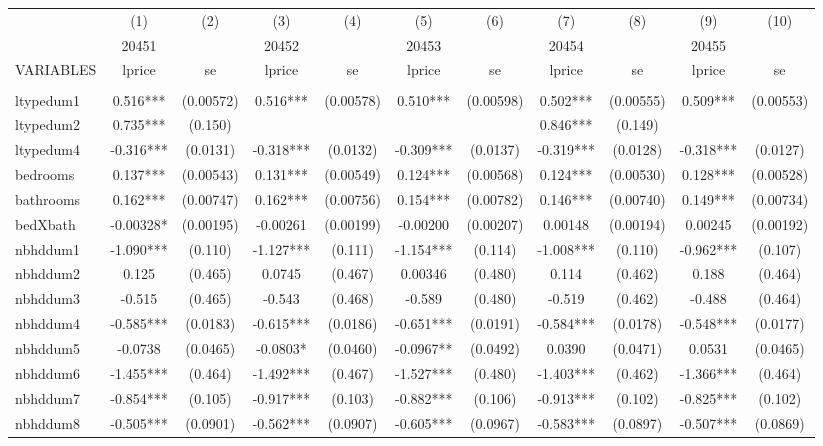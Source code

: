 \documentclass[]{article}
\begin{document}
\begin{tabular}{lcccccccccc} \hline
 & (1) & (2) & (3) & (4) & (5) & (6) & (7) & (8) & (9) & (10) \\
 & 20451 &  & 20452 &  & 20453 &  & 20454 &  & 20455 &  \\
VARIABLES & lprice & se & lprice & se & lprice & se & lprice & se & lprice & se \\ \hline
 &  &  &  &  &  &  &  &  &  &  \\
ltypedum1 & 0.516*** & (0.00572) & 0.516*** & (0.00578) & 0.510*** & (0.00598) & 0.502*** & (0.00555) & 0.509*** & (0.00553) \\
ltypedum2 & 0.735*** & (0.150) &  &  &  &  & 0.846*** & (0.149) &  &  \\
ltypedum4 & -0.316*** & (0.0131) & -0.318*** & (0.0132) & -0.309*** & (0.0137) & -0.319*** & (0.0128) & -0.318*** & (0.0127) \\
bedrooms & 0.137*** & (0.00543) & 0.131*** & (0.00549) & 0.124*** & (0.00568) & 0.124*** & (0.00530) & 0.128*** & (0.00528) \\
bathrooms & 0.162*** & (0.00747) & 0.162*** & (0.00756) & 0.154*** & (0.00782) & 0.146*** & (0.00740) & 0.149*** & (0.00734) \\
bedXbath & -0.00328* & (0.00195) & -0.00261 & (0.00199) & -0.00200 & (0.00207) & 0.00148 & (0.00194) & 0.00245 & (0.00192) \\
nbhddum1 & -1.090*** & (0.110) & -1.127*** & (0.111) & -1.154*** & (0.114) & -1.008*** & (0.110) & -0.962*** & (0.107) \\
nbhddum2 & 0.125 & (0.465) & 0.0745 & (0.467) & 0.00346 & (0.480) & 0.114 & (0.462) & 0.188 & (0.464) \\
nbhddum3 & -0.515 & (0.465) & -0.543 & (0.468) & -0.589 & (0.480) & -0.519 & (0.462) & -0.488 & (0.464) \\
nbhddum4 & -0.585*** & (0.0183) & -0.615*** & (0.0186) & -0.651*** & (0.0191) & -0.584*** & (0.0178) & -0.548*** & (0.0177) \\
nbhddum5 & -0.0738 & (0.0465) & -0.0803* & (0.0460) & -0.0967** & (0.0492) & 0.0390 & (0.0471) & 0.0531 & (0.0465) \\
nbhddum6 & -1.455*** & (0.464) & -1.492*** & (0.467) & -1.527*** & (0.480) & -1.403*** & (0.462) & -1.366*** & (0.464) \\
nbhddum7 & -0.854*** & (0.105) & -0.917*** & (0.103) & -0.882*** & (0.106) & -0.913*** & (0.102) & -0.825*** & (0.102) \\
nbhddum8 & -0.505*** & (0.0901) & -0.562*** & (0.0907) & -0.605*** & (0.0967) & -0.583*** & (0.0897) & -0.507*** & (0.0869) \\

\end{tabular}
\end{document}

